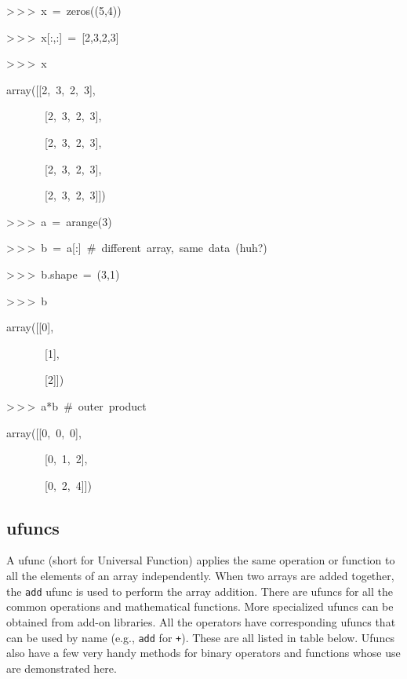 \begin{lyxcode}
>\,{}>\,{}>~x~=~zeros((5,4))

>\,{}>\,{}>~x{[}:,:]~=~{[}2,3,2,3]

>\,{}>\,{}>~x

array({[}{[}2,~3,~2,~3],

~~~~~~~{[}2,~3,~2,~3],

~~~~~~~{[}2,~3,~2,~3],

~~~~~~~{[}2,~3,~2,~3],

~~~~~~~{[}2,~3,~2,~3]])

>\,{}>\,{}>~a~=~arange(3)

>\,{}>\,{}>~b~=~a{[}:]~\#~different~array,~same~data~(huh?)

>\,{}>\,{}>~b.shape~=~(3,1)

>\,{}>\,{}>~b

array({[}{[}0],

~~~~~~~{[}1],

~~~~~~~{[}2]])

>\,{}>\,{}>~a{*}b~\#~outer~product

array({[}{[}0,~0,~0],

~~~~~~~{[}0,~1,~2],

~~~~~~~{[}0,~2,~4]])
\end{lyxcode}

\subsection{ufuncs}

A ufunc (short for Universal Function) applies the same operation
or function to all the elements of an array independently. When two
arrays are added together, the \texttt{add} ufunc is used to perform
the array addition. There are ufuncs for all the common operations
and mathematical functions. More specialized ufuncs can be obtained
from add-on libraries. All the operators have corresponding ufuncs
that can be used by name (e.g., \texttt{add} for \texttt{+}). These
are all listed in table below. Ufuncs also have a few very handy methods
for binary operators and functions whose use are demonstrated here.

